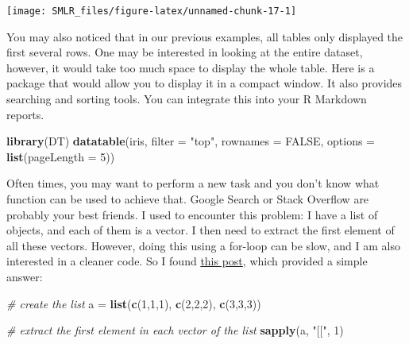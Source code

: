 \documentclass[
]{book}
\newenvironment{Shaded}{\begin{snugshade}}{\end{snugshade}}
\newcommand{\CommentTok}[1]{\textcolor[rgb]{0.56,0.35,0.01}{\textit{#1}}}
\newcommand{\DataTypeTok}[1]{\textcolor[rgb]{0.13,0.29,0.53}{#1}}
\newcommand{\DecValTok}[1]{\textcolor[rgb]{0.00,0.00,0.81}{#1}}
\newcommand{\KeywordTok}[1]{\textcolor[rgb]{0.13,0.29,0.53}{\textbf{#1}}}
\newcommand{\NormalTok}[1]{#1}
\newcommand{\OtherTok}[1]{\textcolor[rgb]{0.56,0.35,0.01}{#1}}
\newcommand{\StringTok}[1]{\textcolor[rgb]{0.31,0.60,0.02}{#1}}
\begin{document}
\begin{center}\texttt{[image: SMLR\_files/figure-latex/unnamed-chunk-17-1]} \end{center}

You may also noticed that in our previous examples, all tables only displayed the first several rows. One may be interested in looking at the entire dataset, however, it would take too much space to display the whole table. Here is a package that would allow you to display it in a compact window. It also provides searching and sorting tools. You can integrate this into your R Markdown reports.

\begin{Shaded}
\begin{Highlighting}[]
  \KeywordTok{library}\NormalTok{(DT)}
  \KeywordTok{datatable}\NormalTok{(iris, }\DataTypeTok{filter =} \StringTok{"top"}\NormalTok{, }\DataTypeTok{rownames =} \OtherTok{FALSE}\NormalTok{,}
            \DataTypeTok{options =} \KeywordTok{list}\NormalTok{(}\DataTypeTok{pageLength =} \DecValTok{5}\NormalTok{))}
\end{Highlighting}
\end{Shaded}

Often times, you may want to perform a new task and you don't know what function can be used to achieve that. Google Search or Stack Overflow are probably your best friends. I used to encounter this problem: I have a list of objects, and each of them is a vector. I then need to extract the first element of all these vectors. However, doing this using a for-loop can be slow, and I am also interested in a cleaner code. So I found \href{https://stackoverflow.com/questions/44176908/r-list-get-first-item-of-each-element}{this post}, which provided a simple answer:

\begin{Shaded}
\begin{Highlighting}[]
  \CommentTok{# create the list}
\NormalTok{  a =}\StringTok{ }\KeywordTok{list}\NormalTok{(}\KeywordTok{c}\NormalTok{(}\DecValTok{1}\NormalTok{,}\DecValTok{1}\NormalTok{,}\DecValTok{1}\NormalTok{), }\KeywordTok{c}\NormalTok{(}\DecValTok{2}\NormalTok{,}\DecValTok{2}\NormalTok{,}\DecValTok{2}\NormalTok{), }\KeywordTok{c}\NormalTok{(}\DecValTok{3}\NormalTok{,}\DecValTok{3}\NormalTok{,}\DecValTok{3}\NormalTok{))}
  
  \CommentTok{# extract the first element in each vector of the list}
  \KeywordTok{sapply}\NormalTok{(a, }\StringTok{"[["}\NormalTok{, }\DecValTok{1}\NormalTok{)}
\end{Highlighting}
\end{Shaded}
\end{document}
